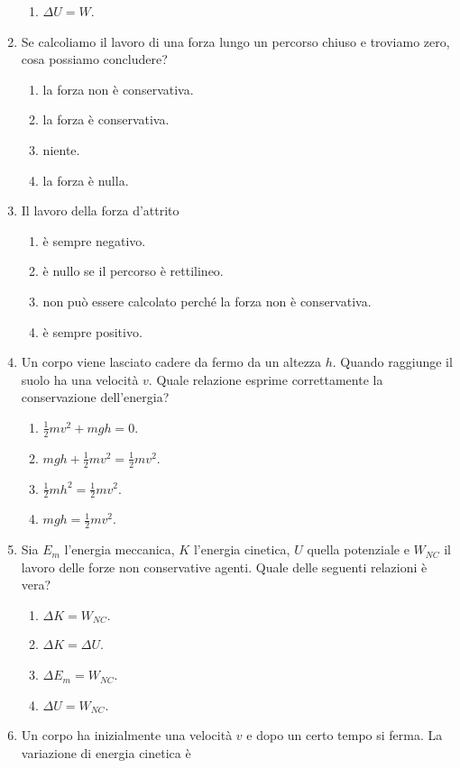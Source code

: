 \documentclass{article}
\begin{document}
\begin{enumerate}
\begin{enumerate}[label=\Alph*.]
    \item $\Delta U=W$.
  \end{enumerate}
  \item Se calcoliamo il lavoro di una forza lungo un percorso chiuso e troviamo zero, cosa possiamo concludere?
  \begin{enumerate}[label=\Alph*.]
    \item la forza non è conservativa.
    \item la forza è conservativa.
    \item niente.
    \item la forza è nulla.
  \end{enumerate}
  \item Il lavoro della forza d'attrito
  \begin{enumerate}[label=\Alph*.]
    \item è sempre negativo.
    \item è nullo se il percorso è rettilineo.
    \item non può essere calcolato perché la forza non è conservativa.
    \item è sempre positivo.
  \end{enumerate}
  \item Un corpo viene lasciato cadere da fermo da un altezza $h$. Quando raggiunge il suolo ha una velocità $v$. Quale relazione esprime correttamente la conservazione dell'energia?
  \begin{enumerate}[label=\Alph*.]
    \item $\frac{1}{2}mv^2+mgh=0.$
    \item $mgh+\frac{1}{2}mv^2=\frac{1}{2}mv^2.$
    \item $\frac{1}{2}mh^2=\frac{1}{2}mv^2$.
    \item $mgh=\frac{1}{2}mv^2$.
  \end{enumerate}
  \item Sia $E_m$ l'energia meccanica, $K$ l'energia cinetica, $U$ quella potenziale e $W_{NC}$ il lavoro delle forze non conservative agenti. Quale delle seguenti relazioni è vera?
  \begin{enumerate}[label=\Alph*.]
    \item $\Delta K=W_{NC}.$
    \item $\Delta K = \Delta U$.
    \item $\Delta E_m=W_{NC}$.
    \item $\Delta U=W_{NC}$.
  \end{enumerate}
  \item Un corpo ha inizialmente una velocità $v$ e dopo un certo tempo si ferma. La variazione di energia cinetica è

\end{enumerate}
\end{document}
